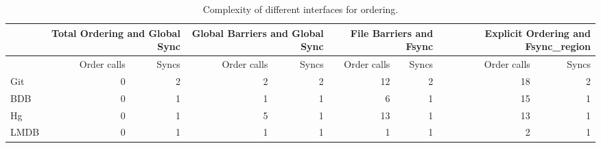 \setlength{\tempa}{\tabcolsep}
\setlength{\tabcolsep}{1pt}
\begin{table}[t]
{\scriptsize
\begin{tabular}{l|r|r|r|r|r|r|r|r}
\hline
 & \multicolumn{2}{p{0.75cm}|}{Total Ordering and Global Sync} & \multicolumn{2}{p{1.5cm}|}{Global Barriers and Global Sync} & \multicolumn{2}{p{1.5cm}|}{File Barriers and Fsync}&\multicolumn{2}{p{1.5cm}}{Explicit Ordering and Fsync\_region} \\ \hline
 & Order calls & Syncs & Order calls & Syncs & Order calls & Syncs & Order calls & Syncs \\ \hline
Git & 0 & 2 & 2 & 2 & 12 & 2 & 18 & 2 \\ \hline
BDB & 0 & 1 & 1 & 1 & 6 & 1 & 15 & 1 \\ \hline
Hg & 0 & 1 & 5 & 1 & 13 & 1 & 13 & 1 \\ \hline
LMDB & 0 & 1 & 1 & 1 & 1 & 1 & 2 & 1 \\ \hline
\end{tabular}
}
\caption{Complexity of different interfaces for ordering.}
\label{tbl-interfaces}
\end{table}
\setlength{\tabcolsep}{\tempa}


